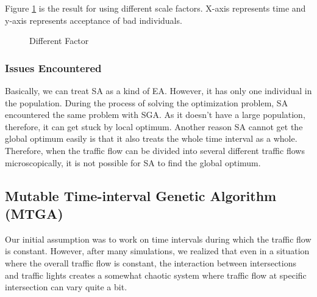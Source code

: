 \documentclass{article} %
\begin{document}
Figure \ref{fig:diff_f} is the result for using different scale factors. X-axis represents time and y-axis represents acceptance of bad individuals.
\begin{figure}[h]
 \centering
  \caption{Different Factor}
   \label{fig:diff_f} %
\end{figure}

\subsubsection{Issues Encountered}
Basically, we can treat SA as a kind of EA. However, it has only one individual in the population. During the process of solving the optimization problem, SA encountered the same problem with SGA. As it doesn't have a large population, therefore, it can get stuck by local optimum. Another reason SA cannot get the global optimum easily is that it also treats the whole time interval as a whole. Therefore, when the traffic flow can be divided into several different traffic flows microscopically, it is not possible for SA to find the global optimum. 


\subsection{Mutable Time-interval Genetic Algorithm (MTGA)}
Our initial assumption was to work on time intervals during which the traffic flow is constant. However, after many simulations, we realized that even in a situation where the overall traffic flow is constant, the interaction between intersections and traffic lights creates a somewhat chaotic system where traffic flow at specific intersection can vary quite a bit. 
\end{document}
